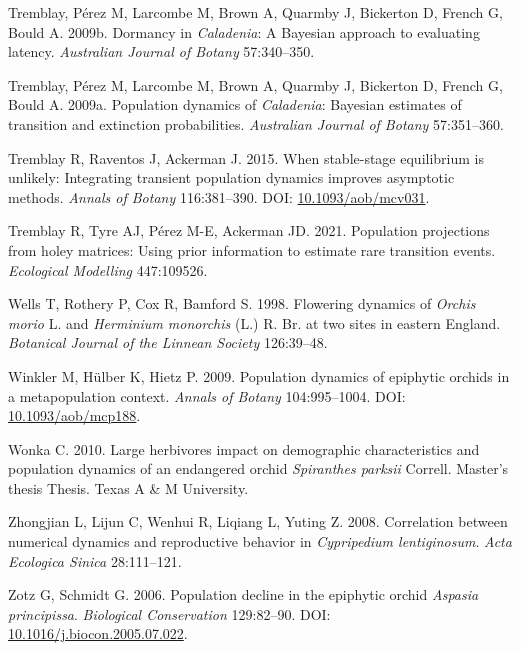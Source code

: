 \documentclass[
  12pt,
  letterpaper,
]{book}
\newlength{\cslhangindent}
\newenvironment{CSLReferences}[2] %
 {\begin{list}{}{%
  \setlength{\itemindent}{0pt}
  \setlength{\leftmargin}{0pt}
  \setlength{\parsep}{0pt}
  \ifodd #1
   \setlength{\leftmargin}{\cslhangindent}
   \setlength{\itemindent}{-1\cslhangindent}
  \fi
  \setlength{\itemsep}{#2\baselineskip}}}
 {\end{list}}
\begin{document}
\begin{CSLReferences}{1}{0}
Tremblay, Pérez M, Larcombe M, Brown A, Quarmby J, Bickerton D, French
G, Bould A. 2009b. Dormancy in \emph{{C}aladenia}: A {B}ayesian approach
to evaluating latency. \emph{Australian Journal of Botany} 57:340--350.

Tremblay, Pérez M, Larcombe M, Brown A, Quarmby J, Bickerton D, French
G, Bould A. 2009a. Population dynamics of \emph{{C}aladenia}: Bayesian
estimates of transition and extinction probabilities. \emph{Australian
Journal of Botany} 57:351--360.

Tremblay R, Raventos J, Ackerman J. 2015. When stable-stage equilibrium
is unlikely: Integrating transient population dynamics improves
asymptotic methods. \emph{Annals of Botany} 116:381--390. DOI:
\href{https://doi.org/10.1093/aob/mcv031}{10.1093/aob/mcv031}.

Tremblay R, Tyre AJ, Pérez M-E, Ackerman JD. 2021. Population
projections from holey matrices: Using prior information to estimate
rare transition events. \emph{Ecological Modelling} 447:109526.

Wells T, Rothery P, Cox R, Bamford S. 1998. Flowering dynamics of
\emph{{O}rchis {m}orio} {L}. {a}nd \emph{{H}erminium {m}onorchis} ({L}.)
{R. Br.} {a}t two sites in eastern {E}ngland. \emph{Botanical Journal of
the Linnean Society} 126:39--48.

Winkler M, Hülber K, Hietz P. 2009. Population dynamics of epiphytic
orchids in a metapopulation context. \emph{Annals of Botany}
104:995--1004. DOI:
\href{https://doi.org/10.1093/aob/mcp188}{10.1093/aob/mcp188}.

Wonka C. 2010. Large herbivores impact on demographic characteristics
and population dynamics of an endangered orchid \emph{{S}piranthes
{p}arksii} {C}orrell. Master's thesis Thesis. Texas A \& M University.

Zhongjian L, Lijun C, Wenhui R, Liqiang L, Yuting Z. 2008. Correlation
between numerical dynamics and reproductive behavior in
\emph{{C}ypripedium {l}entiginosum}. \emph{Acta Ecologica Sinica}
28:111--121.

Zotz G, Schmidt G. 2006. Population decline in the epiphytic orchid
\emph{{A}spasia {p}rincipissa}. \emph{Biological Conservation}
129:82--90. DOI:
\href{https://doi.org/10.1016/j.biocon.2005.07.022}{10.1016/j.biocon.2005.07.022}.

\end{CSLReferences}


\backmatter
\end{document}
